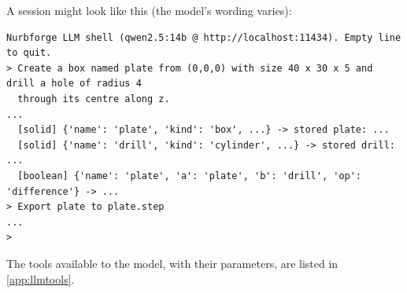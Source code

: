 A session might look like this (the model's wording varies):

\begin{lstlisting}[style=text]
Nurbforge LLM shell (qwen2.5:14b @ http://localhost:11434). Empty line to quit.
> Create a box named plate from (0,0,0) with size 40 x 30 x 5 and drill a hole of radius 4
  through its centre along z.
...
  [solid] {'name': 'plate', 'kind': 'box', ...} -> stored plate: ...
  [solid] {'name': 'drill', 'kind': 'cylinder', ...} -> stored drill: ...
  [boolean] {'name': 'plate', 'a': 'plate', 'b': 'drill', 'op': 'difference'} -> ...
> Export plate to plate.step
...
>
\end{lstlisting}

The tools available to the model, with their parameters, are listed in \cref{app:llmtools}.
